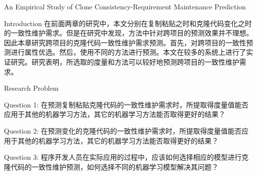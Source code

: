 
{An Empirical Study of Clone Consistency-Requirement Maintenance Prediction}


{Introduction}
在前面两章的研究中，本文分别在复制粘贴之时和克隆代码变化之时的一致性维护需求。但是在研究中发现，方法中针对跨项目的预测效果并不理想。因此本章研究跨项目的克隆代码一致性维护需求预测。首先，对跨项目的一致性预测进行属性优选。然后，使用不同的方法进行预测。本文在较多的系统上进行了实证研究。研究表明，所选取的度量和方法可以较好地预测跨项目的一致性维护需求。

{Research Problem}

Question 1: 在预测复制粘贴克隆代码的一致性维护需求时，所提取得度量值能否应用于其他的机器学习方法，其它的机器学习方法能否取得更好的结果？

Question 2: 在预测变化的克隆代码的一致性维护需求时，所提取得度量值能否应用于其他的机器学习方法，其它的机器学习方法能否取得更好的结果？

Question 3: 程序开发人员在实际应用的过程中，应该如何选择相应的模型进行克隆代码的一致性维护预测，如何选择不同的机器学习模型解决其问题？